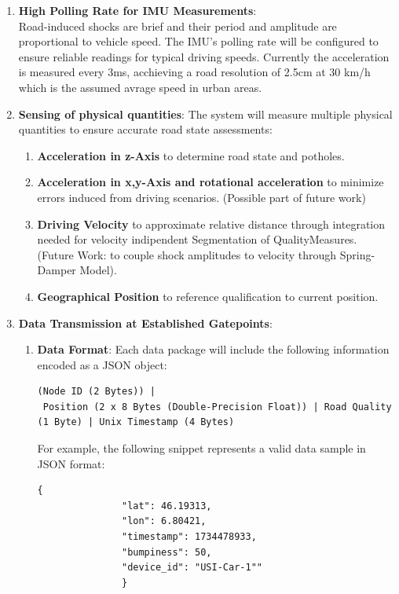 \begin{enumerate}
   \item \textbf{High Polling Rate for IMU Measurements}: \\
      Road-induced shocks are brief and their period and amplitude are proportional to vehicle speed. The IMU's polling rate will be configured to ensure reliable readings for typical driving speeds.
      Currently the acceleration is measured every 3ms, acchieving a road resolution of 2.5cm at 30 km/h which is the assumed avrage speed in urban areas.
    
   \item \textbf{Sensing of physical quantities}:
      The system will measure multiple physical quantities to ensure accurate road state assessments:
      \begin{enumerate}
      \item \textbf{Acceleration in z-Axis} to determine road state and potholes.
      \item \textbf{Acceleration in x,y-Axis and rotational acceleration} to minimize errors induced from driving scenarios. (Possible part of future work)
      \item \textbf{Driving Velocity} to approximate relative distance through integration needed for velocity indipendent Segmentation of QualityMeasures. \\ (Future Work: to couple shock amplitudes to velocity through Spring-Damper Model).
      \item \textbf{Geographical Position} to reference qualification to current position.
      \end{enumerate}
    
   \item \textbf{Data Transmission at Established Gatepoints}: \\
      \begin{enumerate}
          \item \textbf{Data Format}: Each data package will include the following information encoded as a JSON object:
            \begin{lstlisting}[breaklines=true, basicstyle=\ttfamily]
(Node ID (2 Bytes)) |
 Position (2 x 8 Bytes (Double-Precision Float)) | Road Quality (1 Byte) | Unix Timestamp (4 Bytes)
            \end{lstlisting}

            For example, the following snippet represents a valid data sample in JSON format:

            \begin{lstlisting}[breaklines=true, basicstyle=\ttfamily]
               {               
               "lat": 46.19313,
               "lon": 6.80421,
               "timestamp": 1734478933,
               "bumpiness": 50,
               "device_id": "USI-Car-1""
               }
            \end{lstlisting}


\end{enumerate}
\end{enumerate}
